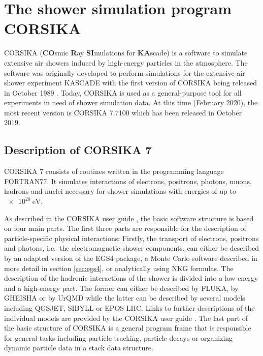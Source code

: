 \section{The shower simulation program CORSIKA}

\label{sec:corsika}

CORSIKA (\textbf{CO}smic \textbf{R}ay \textbf{SI}mulations for \textbf{KA}scade) is a software to simulate extensive air showers induced by high-energy particles in the atmosphere.
The software was originally developed to perform simulations for the extensive air shower experiment KASCADE with the first version of CORSIKA being released in October 1989 \cite{userguide}.
Today, CORSIKA is used as a general-purpose tool for all experiments in need of shower simulation data.
At this time (February 2020), the most recent version is CORSIKA 7.7100 which has been released in October 2019.

\subsection{Description of CORSIKA 7}

CORSIKA 7 consists of routines written in the programming language FORTRAN77.
It simulates interactions of electrons, positrons, photons, muons, hadrons and nuclei necessary for shower simulations with energies of up to $\SI{e20}{\electronvolt}$.

As described in the CORSIKA user guide \cite{userguide}, the basic software structure is based on four main parts.
The first three parts are responsible for the description of particle-specific physical interactions:
Firstly, the transport of electrons, positrons and photons, i.e.\ the electromagnetic shower components, can either be described by an adapted version of the EGS4 package, a Monte Carlo software described in more detail in section \ref{sec:egs4}, or analytically using NKG formulas.
The description of the hadronic interactions of the shower is divided into a low-energy and a high-energy part.
The former can either be described by FLUKA, by GHEISHA or by UrQMD while the latter can be described by several models including QGSJET, SIBYLL or EPOS LHC.
Links to further descriptions of the individual models are provided by the CORSIKA user guide \cite{userguide}.
The last part of the basic structure of CORSIKA is a general program frame that is responsible for general tasks including particle tracking, particle decays or organizing dynamic particle data in a stack data structure.

